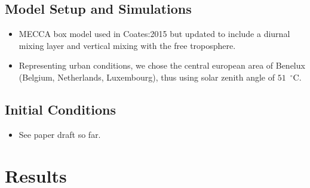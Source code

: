 \documentclass[11pt,a4paper]{article}
\begin{document}
\subsection{Model Setup and Simulations}
\begin{itemize}
    \item MECCA box model used in Coates:2015 but updated to include a diurnal mixing layer and vertical mixing with the free troposphere.
    \item Representing urban conditions, we chose the central european area of Benelux (Belgium, Netherlands, Luxembourg), thus using solar zenith angle of $51$~$^{\circ}$C.
\end{itemize}

\subsection{Initial Conditions}
\begin{itemize}
    \item See paper draft so far.
\end{itemize}

\section{Results} \label{s:results}
\end{document}
